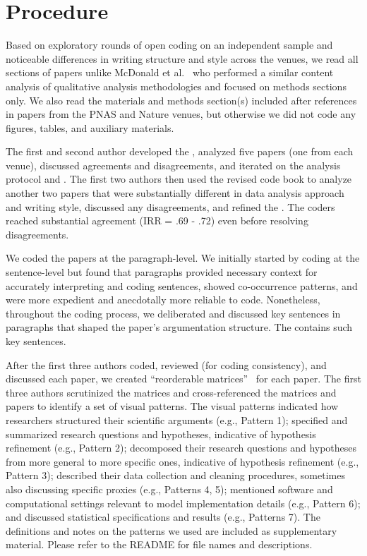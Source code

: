 \section{Procedure} \label{appendix:contentAnalysisProcedure}
Based on exploratory rounds of open coding on an independent sample and
noticeable differences in writing structure and style across the venues, we read
all sections of papers unlike McDonald et al.~\cite{mcdonald2019reliability} who
performed a similar content analysis of qualitative analysis methodologies and
focused on methods sections only. We also read the materials and methods section(s)
included after references in papers from the PNAS and Nature venues, but
otherwise we did not code any figures, tables, and auxiliary materials. 

The first and second author developed the \codebook, analyzed five papers (one
from each venue), discussed agreements and disagreements, and iterated on the
analysis protocol and \codebook. The first two authors then used the revised code
book to analyze another two papers that were substantially different in data
analysis approach and writing style, discussed any disagreements, and refined
the \codebook. The coders reached substantial agreement (IRR = .69 - .72) even
before resolving disagreements. 

We coded the papers at the paragraph-level. We initially started by coding at
the sentence-level but found that paragraphs provided necessary context for
accurately interpreting and coding sentences, showed co-occurrence patterns, and
were more expedient and anecdotally more reliable to code. Nonetheless,
throughout the coding process, we deliberated and discussed key sentences in
paragraphs that shaped the paper's argumentation structure. The \codebook
contains such key sentences. 

After the first three authors coded, reviewed (for coding consistency), and
discussed each paper, we created ``reorderable
matrices''~\cite{bertin2011graphics} for each paper. The first three authors
scrutinized the matrices and cross-referenced the matrices and papers to
identify a set of visual patterns. The visual patterns indicated how researchers
structured their scientific arguments (e.g., Pattern 1); specified and
summarized research questions and hypotheses, indicative of hypothesis
refinement (e.g., Pattern 2); decomposed their research questions and hypotheses
from more general to more specific ones, indicative of hypothesis refinement
(e.g., Pattern 3); described their data collection and cleaning procedures,
sometimes also discussing specific proxies (e.g., Patterns 4, 5); mentioned
software and computational settings relevant to model implementation details
(e.g., Pattern 6); and discussed statistical specifications and results (e.g.,
Patterns 7). The definitions and notes on the patterns we used are included
as supplementary material. Please refer to the README for file names and
descriptions. 


